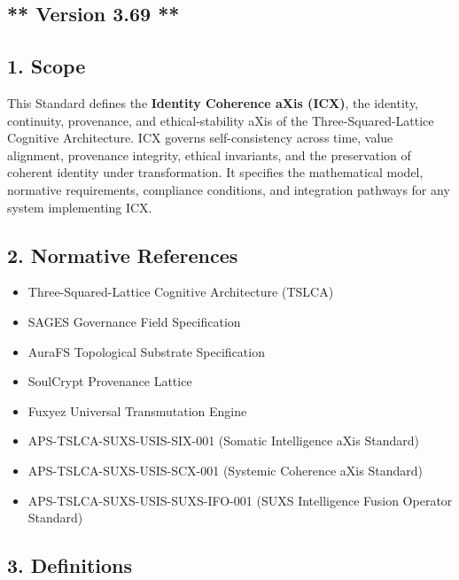 \subsection{** Version 3.69 **}\label{version-3.69}

\subsection{1. Scope}\label{scope}

This Standard defines the \textbf{Identity Coherence aXis (ICX)}, the identity, continuity, provenance, and ethical-stability aXis of the Three-Squared-Lattice Cognitive Architecture. ICX governs self-consistency across time, value alignment, provenance integrity, ethical invariants, and the preservation of coherent identity under transformation. It specifies the mathematical model, normative requirements, compliance conditions, and integration pathways for any system implementing ICX.

\subsection{2. Normative References}\label{normative-references}

\begin{itemize}
\tightlist
\item
  Three-Squared-Lattice Cognitive Architecture (TSLCA)
\item
  SAGES Governance Field Specification
\item
  AuraFS Topological Substrate Specification
\item
  SoulCrypt Provenance Lattice
\item
  Fuxyez Universal Transmutation Engine
\item
  APS-TSLCA-SUXS-USIS-SIX-001 (Somatic Intelligence aXis Standard)
\item
  APS-TSLCA-SUXS-USIS-SCX-001 (Systemic Coherence aXis Standard)
\item
  APS-TSLCA-SUXS-USIS-SUXS-IFO-001 (SUXS Intelligence Fusion Operator Standard)
\end{itemize}

\subsection{3. Definitions}\label{definitions}

